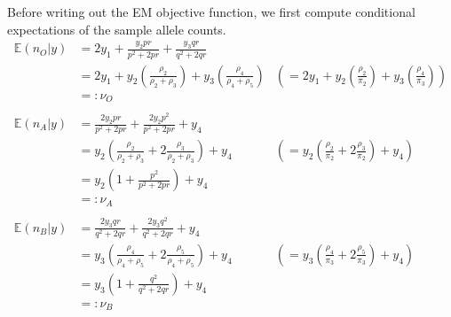 \documentclass[11pt, oneside]{article}   	%
\newcommand{\bE}{\mathbb{E}}
\begin{document}
\begin{appendices}
    Before writing out the EM objective function, we first compute conditional expectations of the sample allele counts.
    \begin{align}
        \bE(n_O|y) &= 2y_1 + \frac{y_2 pr}{p^2 + 2pr} + \frac{y_3 qr}{q^2 + 2qr}\\
        &= 2y_1 + y_2 \left( \frac{\rho_2}{\rho_2 + \rho_3} \right) + y_3 \left( \frac{\rho_4}{\rho_4 + \rho_5} \right) &\left( = 2y_1 +  y_2 \left( \frac{\rho_2}{\pi_2} \right) + y_3 \left( \frac{\rho_4}{\pi_3} \right) \right)\\
        &=: \nu_O\\
        \nonumber \\
        \bE(n_A|y) &= \frac{2 y_2 pr}{p^2 + 2pr} + \frac{2y_2 p^2}{p^2 + 2pr} + y_4\\
        &= y_2 \left( \frac{\rho_2}{\rho_2 + \rho_3} + 2 \frac{\rho_3}{\rho_2 + \rho_3} \right) + y_4 &\left(= y_2 \left( \frac{\rho_2}{\pi_2} + 2\frac{\rho_3}{\pi_2} \right) + y_4 \right)\\
        &= y_2 \left( 1 + \frac{p^2}{p^2 + 2pr} \right) + y_4\\
        &=: \nu_A\\
        \nonumber \\
        \bE(n_B|y) &= \frac{2 y_3 qr}{q^2 + 2qr} + \frac{2y_3 q^2}{q^2 + 2qr} + y_4\\
        &= y_3 \left( \frac{\rho_4}{\rho_4 + \rho_5} + 2\frac{\rho_5}{\rho_4 + \rho_5} \right) + y_4 &\left(= y_3 \left( \frac{\rho_4}{\pi_3} + 2\frac{\rho_5}{\pi_3} \right) + y_4 \right)\\
        &= y_3 \left( 1 + \frac{q^2}{q^2 + 2qr} \right) + y_4\\
        &=: \nu_B
    \end{align}
    

\end{appendices}
\end{document}
